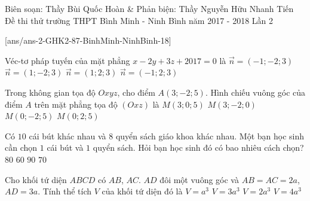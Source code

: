 
\begin{name}
{Biên soạn: Thầy Bùi Quốc Hoàn \& Phản biện: Thầy Nguyễn Hữu Nhanh Tiến}
{Đề thi thử trường THPT Bình Minh - Ninh Bình năm 2017 - 2018 Lần 2}
\end{name}
\setcounter{ex}{0}\setcounter{bt}{0}
[ans/ans-2-GHK2-87-BinhMinh-NinhBinh-18]

\begin{ex}%
Véc-tơ pháp tuyến của mặt phẳng $x - 2y + 3z + 2017 = 0$ là	
\choice
	{$\overrightarrow{n} = \left(-1;- 2; 3\right)$}
	{\True $\overrightarrow{n} = \left(1; -2; 3\right)$}
	{$\overrightarrow{n} = \left(1; 2; 3\right)$}
	{$\overrightarrow{n} = \left(-1; 2; 3\right)$}
\end{ex}

\begin{ex}%
Trong không gian tọa độ $Oxyz$, cho điểm $A\left(3; -2; 5\right)$. Hình chiếu vuông góc của điểm $A$ trên mặt phẳng tọa độ $\left(Oxz\right)$ là	
	\choice
	{\True $M\left(3;0; 5\right)$}
	{$M\left(3;- 2; 0\right)$}
	{$M\left(0;- 2; 5\right)$}
	{$M\left(0;2; 5\right)$}
\end{ex}
\begin{ex}%
Có $10$ cái bút khác nhau và $8$ quyển sách giáo khoa khác nhau. Một bạn học sinh cần chọn $1$ cái bút và $1$ quyển sách. Hỏi bạn học sinh đó có bao nhiêu cách chọn?
	\choice
	{\True $80$}
	{$60$}
	{$90$}
	{$70$}
\end{ex}


\begin{ex}%
Cho khối tứ  diện $ABCD$ có $AB$, $AC$. $AD$ đôi một vuông góc và $AB = AC = 2a$, $AD = 3a$. Tính thể tích $V$ của khối  tứ diện đó là
\choice
{$V = a^3$}
{$V = 3a^3$}
{\True $V = 2a^3$}
{$V = 4a^3$}
\end{ex}

